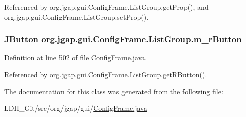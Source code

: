 Referenced by org.\-jgap.\-gui.\-Config\-Frame.\-List\-Group.\-get\-Prop(), and org.\-jgap.\-gui.\-Config\-Frame.\-List\-Group.\-set\-Prop().

\hypertarget{classorg_1_1jgap_1_1gui_1_1_config_frame_1_1_list_group_a2bf8a13a1113df4ff6ce4cb5c64d33ac}{
\subsubsection[{m\-\_\-r\-Button}]{\setlength{\rightskip}{0pt plus 5cm}J\-Button org.\-jgap.\-gui.\-Config\-Frame.\-List\-Group.\-m\-\_\-r\-Button\hspace{0.3cm}{\ttfamily [private]}}}\label{classorg_1_1jgap_1_1gui_1_1_config_frame_1_1_list_group_a2bf8a13a1113df4ff6ce4cb5c64d33ac}


Definition at line 502 of file Config\-Frame.\-java.



Referenced by org.\-jgap.\-gui.\-Config\-Frame.\-List\-Group.\-get\-R\-Button().



The documentation for this class was generated from the following file\-:\begin{DoxyCompactItemize}
\item 
L\-D\-H\-\_\-\-Git/src/org/jgap/gui/\hyperlink{_config_frame_8java}{Config\-Frame.\-java}\end{DoxyCompactItemize}
